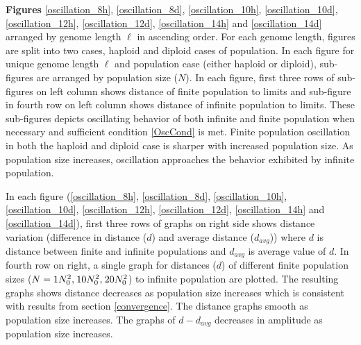 \textbf{ Figures} \ref{oscillation_8h}, \ref{oscillation_8d}, \ref{oscillation_10h}, \ref{oscillation_10d}, \ref{oscillation_12h}, \ref{oscillation_12d}, 
\ref{oscillation_14h} and \ref{oscillation_14d} arranged by genome length $\ell$ in ascending order. For each genome length, figures are split into two 
cases, haploid and diploid cases of population. In each figure for unique genome length $\ell$ and population case (either haploid or diploid), sub-figures 
are arranged by population size ($N$). In each figure, first three rows of sub-figures on left column shows distance of finite population 
to limits and sub-figure in fourth row on left column shows distance of infinite population to limits. These sub-figures depicts 
oscillating behavior of both infinite and finite population when necessary and sufficient condition \ref{OscCond} is met. 
Finite population oscillation in both the haploid and diploid case is sharper with increased population size. 
As population size increases, oscillation approaches the behavior exhibited by infinite population. 

In each figure (\ref{oscillation_8h}, \ref{oscillation_8d}, \ref{oscillation_10h}, \ref{oscillation_10d}, 
\ref{oscillation_12h}, \ref{oscillation_12d}, 
\ref{oscillation_14h} and \ref{oscillation_14d}), first three rows of graphs on right side shows 
distance variation (difference in distance ($d$) and average distance ($d_{avg}$))  
where $d$ is distance between finite and infinite populations and $d_{avg}$ is average value of $d$. 
In fourth row on right, a single graph for distances ($d$) of different finite population sizes 
($N = 1N_0^2, \hspace{0.01in}10N_0^2, \hspace{0.01in}20N_0^2$) to infinite population are plotted. The resulting graphs shows distance decreases 
as population size increases which is consistent with results from section \ref{convergence}. 
The distance graphs smooth as population size increases. The graphs of $d-d_{avg}$ decreases in amplitude as population size increases.

